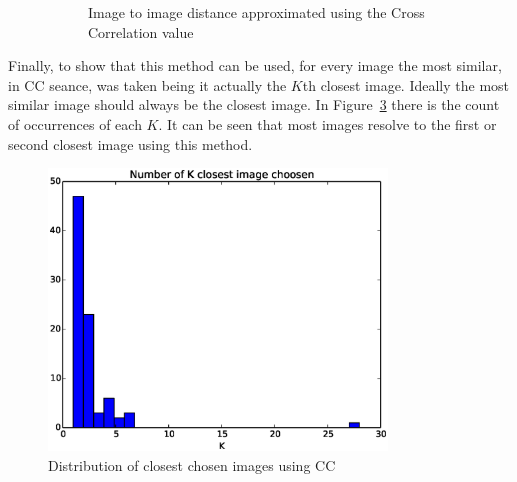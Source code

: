 \begin{figure}
\begin{subfigure}[b]{0.50\linewidth}
         \caption{Image to image distance approximated using the Cross Correlation value}                
         \label{fig:CC_confusion_matrix}
  \end{subfigure}
  \caption{}
\end{figure}


Finally, to show that this method can be used, for every image the most similar, in CC seance, was taken being it actually the  $K$th closest image. Ideally the most similar image should always be the closest image. In Figure~\ref{fig:K_closest} there is the count of occurrences of each $K$. It can be seen that most images resolve to the first or second closest image using this method.\\

\begin{figure}[!htbp]
  \centering
  \includegraphics[width=9cm]{img/demo_1_1_CC_choose_distribution.eps}
  \caption{Distribution of closest chosen images using CC}
  \label{fig:K_closest}
\end{figure}


